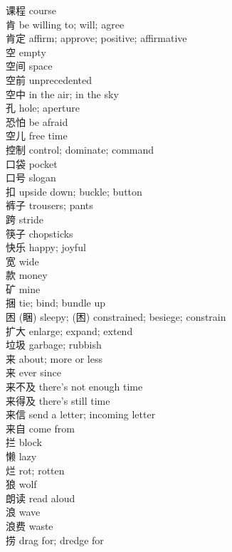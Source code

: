 课程 \quad course\\
肯 \quad be willing to; will; agree\\
肯定 \quad affirm; approve; positive; affirmative\\
空 \quad empty\\
空间 \quad space\\
空前 \quad unprecedented\\
空中 \quad in the air; in the sky\\
孔 \quad hole; aperture\\
恐怕 \quad be afraid\\
空儿 \quad free time\\
控制 \quad control; dominate; command\\
口袋 \quad pocket\\
口号 \quad slogan\\
扣 \quad upside down; buckle; button\\
裤子 \quad trousers; pants\\
跨 \quad stride\\
筷子 \quad chopsticks\\
快乐 \quad happy; joyful\\
宽 \quad wide\\
款 \quad money\\
矿 \quad mine\\
捆 \quad tie; bind; bundle up\\
困 \quad (睏) sleepy; (困) constrained; besiege; constrain\\
扩大 \quad enlarge; expand; extend\\
垃圾 \quad garbage; rubbish\\
来 \quad about; more or less\\
来 \quad ever since\\
来不及 \quad there's not enough time\\
来得及 \quad there's still time\\
来信 \quad send a letter; incoming letter\\
来自 \quad come from\\
拦 \quad block\\
懒 \quad lazy\\
烂 \quad rot; rotten\\
狼 \quad wolf\\
朗读 \quad read aloud\\
浪 \quad wave\\
浪费 \quad waste\\
捞 \quad drag for; dredge for\\
